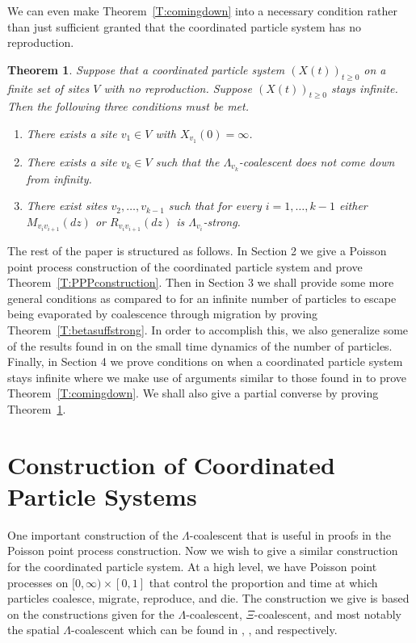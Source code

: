 \documentclass[11pt]{article}
\newtheorem{theorem}{Theorem}
\theoremstyle{definition}
\newcommand{\thmref}[1]{Theorem~\ref{T:#1}}
\begin{document}
\noindent We can even make \thmref{comingdown} into a necessary condition rather than just sufficient granted that the coordinated particle system has no reproduction.

\begin{theorem}\label{T:converse}
    Suppose that a coordinated particle system $(X(t))_{t \geq 0}$ on a finite set of sites $V$ with no reproduction. Suppose $(X(t))_{t \geq 0}$ stays infinite. Then the following three conditions must be met.

    \begin{enumerate}
        \item[(a)] There exists a site $v_1 \in V$ with $X_{v_1}(0) = \infty$.
        
        \item[(b)] There exists a site $v_k \in V$ such that the $\Lambda_{v_k}$-coalescent does not come down from infinity. 

        \item[(c)] There exist sites $v_2, \ldots, v_{k-1}$ such that for every $i = 1, \ldots, k-1$ either $M_{v_iv_{i+1}}(dz)$ or $R_{v_iv_{i+1}}(dz)$ is $\Lambda_{v_i}$-strong.
    \end{enumerate}
\end{theorem}
\medskip

\noindent The rest of the paper is structured as follows. In Section 2 we give a Poisson point process construction of the coordinated particle system and prove \thmref{PPPconstruction}. Then in Section 3 we shall provide some more general conditions as compared to \cite{seedbank2} for an infinite number of particles to escape being evaporated by coalescence through migration by proving \thmref{betasuffstrong}. In order to accomplish this, we also generalize some of the results found in \cite{betasmalltime} on the small time dynamics of the number of particles. Finally, in Section 4 we prove conditions on when a coordinated particle system stays infinite where we make use of arguments similar to those found in \cite{Angel2012} to prove \thmref{comingdown}. We shall also give a partial converse by proving \thmref{converse}.
\medskip

\section{Construction of Coordinated Particle Systems}

One important construction of the $\Lambda$-coalescent that is useful in proofs in the Poisson point process construction. Now we wish to give a similar construction for the coordinated particle system. At a high level, we have Poisson point processes on $[0,\infty) \times [0,1]$ that control the proportion and time at which particles coalesce, migrate, reproduce, and die. The construction we give is based on the constructions given for the $\Lambda$-coalescent, $\Xi$-coalescent, and most notably the spatial $\Lambda$-coalescent which can be found in \cite{pitmanlambda}, \cite{xicoalescent}, and \cite{spatial} respectively. 
\bigskip
\end{document}
